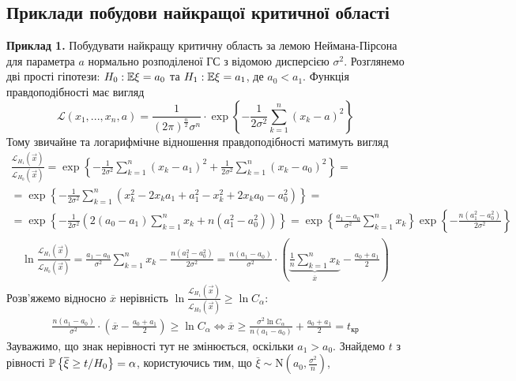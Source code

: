 \subsection{Приклади побудови найкращої критичної області}
\noindent\textbf{Приклад 1.}\label{nko:ex1} Побудувати найкращу критичну область за лемою Неймана-Пірсона
для параметра $a$ нормально розподіленої ГС з відомою дисперсією $\sigma^2$. Розглянемо дві прості гіпотези:
$H_0 : \E\xi = a_0$ та $H_1 : \E\xi = a_1$, де $a_0 < a_1$. Функція правдоподібності має вигляд
$$ \mathcal{L}(x_1, ..., x_n, a) = 
\frac{1}{(2\pi)^{\frac{n}{2}} \sigma^n} \cdot \exp\left\{-\frac{1}{2\sigma^2}\sum\limits_{k=1}^n (x_k - a)^2\right\}$$
Тому звичайне та логарифмічне відношення правдоподібності матимуть вигляд
\begin{gather*}
    \frac{\mathcal{L}_{H_1}(\vec{x})}{\mathcal{L}_{H_0}(\vec{x})} = 
    \exp\left\{ -\frac{1}{2\sigma^2}\sum\limits_{k=1}^n (x_k - a_1)^2 + \frac{1}{2\sigma^2}\sum\limits_{k=1}^n (x_k - a_0)^2\right\} = \\
    = \exp\left\{ -\frac{1}{2\sigma^2}\sum\limits_{k=1}^n \left(x_k^2 - 2x_k a_1 + a_1^2 - x_k^2 + 2x_k a_0 - a_0^2\right)\right\} = \\
    = \exp\left\{ -\frac{1}{2\sigma^2} \left( 2(a_0 - a_1) \sum\limits_{k=1}^n x_k + n(a_1^2 - a_0^2)\right)\right\} = 
    \exp\left\{\frac{a_1 - a_0}{\sigma^2}\sum\limits_{k=1}^n x_k \right\}
    \exp\left\{-\frac{n(a_1^2 - a_0^2)}{2\sigma^2}\right\}
\end{gather*}
\begin{gather*}
    \ln \frac{\mathcal{L}_{H_1}(\vec{x})}{\mathcal{L}_{H_0}(\vec{x})} = 
    \frac{a_1 - a_0}{\sigma^2}\sum\limits_{k=1}^n x_k - \frac{n(a_1^2 - a_0^2)}{2\sigma^2} = 
    \frac{n(a_1 - a_0)}{\sigma^2}\cdot\left(\underbrace{\frac{1}{n}\sum\limits_{k=1}^n x_k}_{\overline{x}} - \frac{a_0 + a_1}{2} \right)
\end{gather*}
Розв'яжемо відносно $\overline{x}$ нерівність $\ln \frac{\mathcal{L}_{H_1}(\vec{x})}{\mathcal{L}_{H_0}(\vec{x})} \geq \ln C_{\alpha}$:
\begin{gather*}
    \frac{n(a_1 - a_0)}{\sigma^2}\cdot \left(\overline{x} - \frac{a_0 + a_1}{2}\right) \geq \ln C_{\alpha} \Leftrightarrow
    \overline{x} \geq \frac{\sigma^2 \ln C_{\alpha}}{n(a_1 - a_0)} + \frac{a_0 + a_1}{2} = t_{\text{кр}}
\end{gather*}
Зауважимо, що знак нерівності тут не змінюється, оскільки $a_1 > a_0$. Знайдемо $t$ з рівності
$\P \left\{\overline{\xi} \geq t / H_0 \right\} = \alpha$, користуючись тим, що $\overline{\xi} \sim \mathrm{N}\left(a_0, \frac{\sigma^2}{n}\right)$, 
